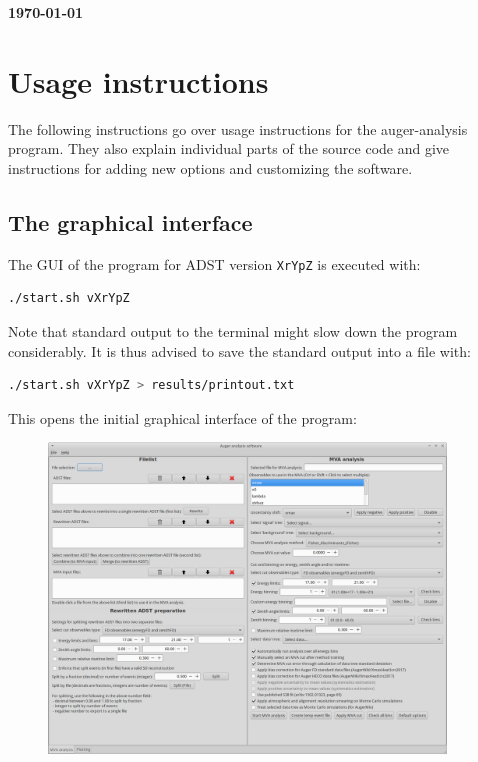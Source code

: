 \documentclass[12pt,a4paper]{report}
\begin{document}

\begin{flushright}
{\large\textbf{\today}}
\end{flushright}

\begingroup
\let\clearpage\relax
\chapter{Usage instructions}
\endgroup
{\noindent}The following instructions go over usage instructions for the auger-analysis program. They also explain individual parts of the source code and give instructions for adding new options and customizing the software.

\section{The graphical interface}
The GUI of the program for ADST version \texttt{XrYpZ} is executed with:
\begin{lstlisting}[language=bash]
  ./start.sh vXrYpZ
\end{lstlisting}
Note that standard output to the terminal might slow down the program considerably. It is thus advised to save the standard output into a file with:
\begin{lstlisting}[language=bash]
  ./start.sh vXrYpZ > results/printout.txt
\end{lstlisting}
This opens the initial graphical interface of the program:
\begin{figure}[H]
\centerline{\includegraphics[width=0.94\textwidth]{figures/software_screenshot_1.png}}
\end{figure}
\end{document}
